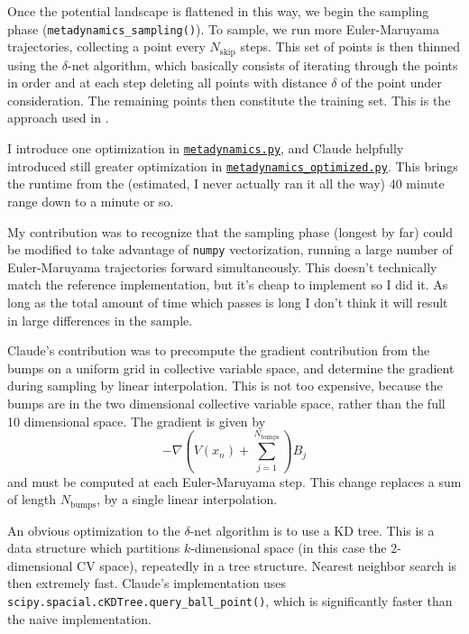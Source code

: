 \documentclass[12pt]{article}
\theoremstyle{ColorTheorem}
\numberwithin{theorem}{section}
\numberwithin{corollary}{section}
\theoremstyle{ColorDefinition}
\theoremstyle{definition}
\theoremstyle{ColorRemark}
\numberwithin{equation}{section}
\begin{document}
Once the potential landscape is flattened in this way, 
we begin the sampling phase (\texttt{metadynamics\_sampling()}).
To sample, we run more Euler-Maruyama trajectories, 
collecting a point every \(N_\text{skip}\) steps. 
This set of points is then thinned using the \(\delta\)-net algorithm,
which basically consists of iterating through the points in order and at each step deleting all points with distance \(\delta\) of the point under consideration.
The remaining points then constitute the training set.
This is the approach used in \cite{make_training_data_face}.

I introduce one optimization in 
\href{https://github.com/jrippeon/amsc665project2/blob/main/src/committor/metadynamics.py}{\texttt{metadynamics.py}},
and Claude helpfully introduced still greater optimization in 
\href{https://github.com/jrippeon/amsc665project2/blob/main/src/committor/metadynamics_optimized.py}{\texttt{metadynamics\_optimized.py}}.
This brings the runtime from the (estimated, I never actually ran it all the way) 40 minute range down to a minute or so.

My contribution was to recognize that the sampling phase (longest by far) could be modified to take advantage of \texttt{numpy} vectorization,
running a large number of Euler-Maruyama trajectories forward simultaneously.
This doesn't technically match the reference implementation, but it's cheap to implement so I did it.
As long as the total amount of time which passes is long I don't think it will result in large differences in the sample. 

Claude's contribution was to precompute the gradient contribution from the bumps on a uniform grid in collective variable space,
and determine the gradient during sampling by linear interpolation.
This is not too expensive, because the bumps are in the two dimensional collective variable space,
rather than the full 10 dimensional space.
The gradient is given by
\begin{equation}
  -\nabla (V(x_n) + \sum_{j=1}^{N_\text{bumps}}) B_j
\end{equation}
and must be computed at each Euler-Maruyama step.
This change replaces a sum of length \(N_\text{bumps}\), by a single linear interpolation.

An obvious optimization to the \(\delta\)-net algorithm is to use a KD tree.
This is a data structure which partitions \(k\)-dimensional space (in this case the 2-dimensional CV space),
repeatedly in a tree structure.
Nearest neighbor search is then extremely fast.
Claude's implementation uses \texttt{scipy.spacial.cKDTree.query\_ball\_point()},
which is significantly faster than the naive implementation.
\end{document}
